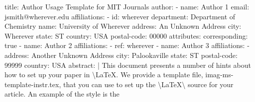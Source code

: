 \documentclass[]{imag-ms-template}
\newenvironment{Shaded}{\begin{snugshade}}{\end{snugshade}}
\newcommand{\AttributeTok}[1]{\textcolor[rgb]{0.40,0.45,0.13}{#1}}
\newcommand{\CharTok}[1]{\textcolor[rgb]{0.13,0.47,0.30}{#1}}
\newcommand{\DecValTok}[1]{\textcolor[rgb]{0.68,0.00,0.00}{#1}}
\newcommand{\FunctionTok}[1]{\textcolor[rgb]{0.28,0.35,0.67}{#1}}
\newcommand{\KeywordTok}[1]{\textcolor[rgb]{0.00,0.23,0.31}{#1}}
\newcommand{\NormalTok}[1]{\textcolor[rgb]{0.00,0.23,0.31}{#1}}
\theoremstyle{plain}
\theoremstyle{remark}
\begin{document}
\begin{Shaded}
\begin{Highlighting}[]
\FunctionTok{title}\KeywordTok{:}\AttributeTok{ Author Usage Template for MIT Journals}
\FunctionTok{author}\KeywordTok{:}
\AttributeTok{  }\KeywordTok{{-}}\AttributeTok{ }\FunctionTok{name}\KeywordTok{:}\AttributeTok{ Author 1}
\AttributeTok{    }\FunctionTok{email}\KeywordTok{:}\AttributeTok{ jsmith@wherever.edu}
\AttributeTok{    }\FunctionTok{affiliations}\KeywordTok{:}
\AttributeTok{      }\KeywordTok{{-}}\AttributeTok{ }\FunctionTok{id}\KeywordTok{:}\AttributeTok{ wherever}
\AttributeTok{        }\FunctionTok{department}\KeywordTok{:}\AttributeTok{ Department of Chemistry}
\AttributeTok{        }\FunctionTok{name}\KeywordTok{:}\AttributeTok{ University of Wherever}
\AttributeTok{        }\FunctionTok{address}\KeywordTok{:}\AttributeTok{ An Unknown Address}
\AttributeTok{        }\FunctionTok{city}\KeywordTok{:}\AttributeTok{ Wherever}
\AttributeTok{        }\FunctionTok{state}\KeywordTok{:}\AttributeTok{ ST}
\AttributeTok{        }\FunctionTok{country}\KeywordTok{:}\AttributeTok{ USA}
\AttributeTok{        }\FunctionTok{postal{-}code}\KeywordTok{:}\AttributeTok{ }\DecValTok{00000}
\AttributeTok{    }\FunctionTok{attributes}\KeywordTok{:}
\AttributeTok{      }\FunctionTok{corresponding}\KeywordTok{:}\AttributeTok{ }\CharTok{true}
\AttributeTok{  }\KeywordTok{{-}}\AttributeTok{ }\FunctionTok{name}\KeywordTok{:}\AttributeTok{ Author 2}
\AttributeTok{    }\FunctionTok{affiliations}\KeywordTok{:}
\AttributeTok{      }\KeywordTok{{-}}\AttributeTok{ }\FunctionTok{ref}\KeywordTok{:}\AttributeTok{ wherever}
\AttributeTok{  }\KeywordTok{{-}}\AttributeTok{ }\FunctionTok{name}\KeywordTok{:}\AttributeTok{ Author 3}
\AttributeTok{    }\FunctionTok{affiliations}\KeywordTok{:}
\AttributeTok{      }\KeywordTok{{-}}\AttributeTok{ }\FunctionTok{address}\KeywordTok{:}\AttributeTok{ Another Unknown Address}
\AttributeTok{        }\FunctionTok{city}\KeywordTok{:}\AttributeTok{ Palookaville}
\AttributeTok{        }\FunctionTok{state}\KeywordTok{:}\AttributeTok{ ST}
\AttributeTok{        }\FunctionTok{postal{-}code}\KeywordTok{:}\AttributeTok{ }\DecValTok{99999}
\AttributeTok{        }\FunctionTok{country}\KeywordTok{:}\AttributeTok{ USA}
\FunctionTok{abstract}\KeywordTok{: }\CharTok{|}
\NormalTok{  This document presents a number of hints about how to set up your}
\NormalTok{  paper in \textbackslash{}LaTeX.  We provide a template file,}
\NormalTok{  \textasciigrave{}imag{-}ms{-}template{-}instr.tex\textasciigrave{}, that you can use to set up the}
\NormalTok{  \textbackslash{}LaTeX\textbackslash{} source for your article.  An example of the style is the}

\end{Highlighting}
\end{Shaded}
\end{document}
